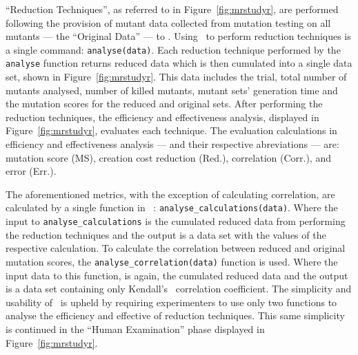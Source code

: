 ``Reduction Techniques'', as referred to in Figure~\ref{fig:mrstudyr}, are performed following the provision
of mutant data collected from mutation testing on all mutants --- the ``Original Data'' --- to \mr. Using
\mr~to perform reduction techniques is a single command: \texttt{analyse(data)}. Each reduction technique performed by
the \texttt{analyse} function returns reduced data which is then cumulated into a single data set, shown in Figure~\ref{fig:mrstudyr}.
This data includes the trial, total number of mutants analysed, number of killed mutants, mutant sets' generation time
and the mutation scores for the reduced and original sets. After performing the reduction techniques,
the efficiency and effectiveness analysis, displayed in Figure~\ref{fig:mrstudyr}, evaluates each technique.
The evaluation calculations in efficiency and effectiveness analysis --- and their respective abreviations --- are: mutation score
(MS), creation cost reduction (Red.), correlation (Corr.), and error (Err.).


The aforementioned metrics, with the exception of calculating correlation, are calculated by a single function in
\mr~: \texttt{analyse\_calculations(data)}. Where the input to \texttt{analyse\_calculations} is the cumulated reduced
data from performing the reduction techniques and the output is a  data set with the values of the respective calculation.
To calculate the correlation between reduced and original mutation scores, the \texttt{analyse\_correlation(data)} function
is used. Where the input data to this function, is again, the cumulated reduced data and the output is a data set containing
only Kendall's \taub~correlation coefficient. The simplicity and usability of \mr~is upheld by requiring experimenters to use
only two functions to analyse the efficiency and effective of reduction techniques. This same simplicity is continued
in the ``Human Examination'' phase displayed in Figure~\ref{fig:mrstudyr}.

